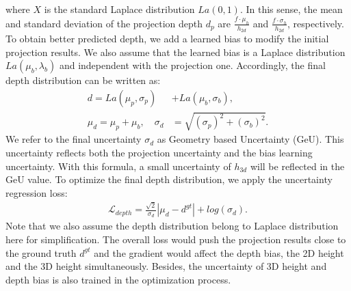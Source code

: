 \documentclass[10pt,twocolumn,letterpaper]{article}
\begin{document}
where $X$ is the standard Laplace distribution $La(0,1)$. In this sense, the mean and standard deviation of the projection depth $d_p$ are $\frac{f\cdot \mu_{h}}{h_{2d}}$ and $\frac{f\cdot \sigma_{h}}{h_{2d}}$, respectively. 
To obtain better predicted depth, we add a learned bias to modify the initial projection results. We also assume that the learned bias is a Laplace distribution $La(\mu_{b},\lambda_{b})$ and independent with the projection one. Accordingly, the final depth distribution can be written as:
\begin{equation}
\begin{aligned}
     d = La(\mu_{p},\sigma_{p}) &+ La(\mu_{b},\sigma_{b}),\\
     \mu_d = \mu_{p}+\mu_{b},\quad \sigma_{d} &= \sqrt{(\sigma_{p})^2+(\sigma_{b})^2}.
\end{aligned}
\end{equation}
We refer to the final uncertainty $\sigma_{d}$ as Geometry based Uncertainty (GeU). This uncertainty reflects both the projection uncertainty and the bias learning uncertainty. With this formula, a small uncertainty of $h_{3d}$ will be reflected in the GeU value. To optimize the final depth distribution, we apply the uncertainty regression loss:
\begin{equation}
\label{eq:depth_loss}
\begin{aligned}
    \mathcal{L}_{depth} = \frac{\sqrt{2}}{\sigma_{d}}|\mu_{d}-d^{gt}|+log(\sigma_{d}).
\end{aligned}
\end{equation}
Note that we also assume the depth distribution belong to Laplace distribution here for simplification. The overall loss would push the projection results close to the ground truth $d^{gt}$ and the gradient would affect the depth bias, the 2D height and the 3D height simultaneously. Besides, the uncertainty of 3D height and depth bias is also trained in the optimization process.
\end{document}
